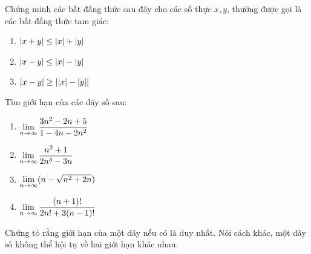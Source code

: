 \begin{exercise} %
    Chứng minh các bất đẳng thức sau đây cho các số thực $x, y$, thường được gọi là các bất đẳng thức tam giác:
    \begin{enumerate}[label=\alph*)]
        \item $\left\lvert x+y \right\rvert \le \left\lvert x \right\rvert + \left\lvert y \right\rvert$
        \item $\left\lvert x-y \right\rvert \le \left\lvert x \right\rvert - \left\lvert y \right\rvert$
        \item $\left\lvert x-y \right\rvert \ge \left\lvert \left\lvert x \right\rvert - \left\lvert y \right\rvert \right\rvert$
    \end{enumerate}
\end{exercise}

\begin{exercise} %
    Tìm giới hạn của các dãy số sau:
    \begin{enumerate}[label=\alph*)]
        \item $\lim\limits_{n \to \infty} \dfrac{3n^2 - 2n + 5}{1 - 4n - 2n^2}$
        \item $\lim\limits_{n \to \infty} \dfrac{n^2 + 1}{2n^3 - 3n}$
        \item $\lim\limits_{n \to \infty} (n - \sqrt{n^2 + 2n})$
        \item $\lim\limits_{n \to \infty} \dfrac{(n+1)!}{2n! + 3(n-1)!}$
    \end{enumerate}
\end{exercise}

\begin{exercise} %
    Chứng tỏ rằng giới hạn của một dãy nếu có là duy nhất. Nói cách khác, một dãy số không thể hội tụ về hai giới hạn khác nhau.
\end{exercise}
